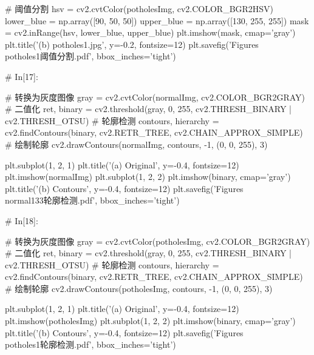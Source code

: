 \documentclass{MathorCupmodeling}
\begin{document}
\begin{python}
# 阈值分割
hsv = cv2.cvtColor(potholesImg, cv2.COLOR_BGR2HSV)
lower_blue = np.array([90, 50, 50])
upper_blue = np.array([130, 255, 255])
mask = cv2.inRange(hsv, lower_blue, upper_blue)
plt.imshow(mask, cmap='gray')
plt.title('(b) potholes1.jpg', y=-0.2, fontsize=12)
plt.savefig('Figures\\potholes1阈值分割.pdf', bbox_inches='tight')

# In[17]:


# 转换为灰度图像
gray = cv2.cvtColor(normalImg, cv2.COLOR_BGR2GRAY)
# 二值化
ret, binary = cv2.threshold(gray, 0, 255, cv2.THRESH_BINARY | cv2.THRESH_OTSU)
# 轮廓检测
contours, hierarchy = cv2.findContours(binary, cv2.RETR_TREE, cv2.CHAIN_APPROX_SIMPLE)
# 绘制轮廓
cv2.drawContours(normalImg, contours, -1, (0, 0, 255), 3)

plt.subplot(1, 2, 1)
plt.title('(a) Original', y=-0.4, fontsize=12)
plt.imshow(normalImg)
plt.subplot(1, 2, 2)
plt.imshow(binary, cmap='gray')
plt.title('(b) Contours', y=-0.4, fontsize=12)
plt.savefig('Figures\\normal133轮廓检测.pdf', bbox_inches='tight')

# In[18]:


# 转换为灰度图像
gray = cv2.cvtColor(potholesImg, cv2.COLOR_BGR2GRAY)
# 二值化
ret, binary = cv2.threshold(gray, 0, 255, cv2.THRESH_BINARY | cv2.THRESH_OTSU)
# 轮廓检测
contours, hierarchy = cv2.findContours(binary, cv2.RETR_TREE, cv2.CHAIN_APPROX_SIMPLE)
# 绘制轮廓
cv2.drawContours(potholesImg, contours, -1, (0, 0, 255), 3)

plt.subplot(1, 2, 1)
plt.title('(a) Original', y=-0.4, fontsize=12)
plt.imshow(potholesImg)
plt.subplot(1, 2, 2)
plt.imshow(binary, cmap='gray')
plt.title('(b) Contours', y=-0.4, fontsize=12)
plt.savefig('Figures\\potholes1轮廓检测.pdf', bbox_inches='tight')

\end{python}
\end{document}
